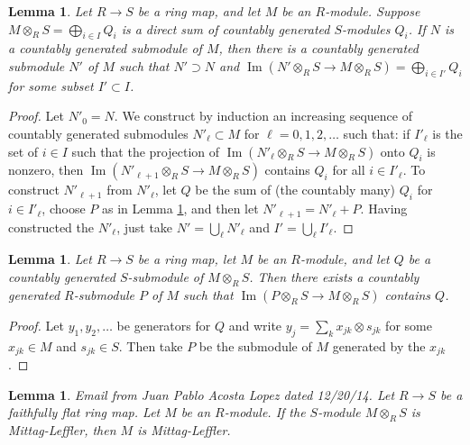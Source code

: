 \documentclass{amsart}
\newenvironment{reference}{\comment}{\endcomment}
\theoremstyle{plain}
\newtheorem{lemma}[subsection]{Lemma}
\theoremstyle{definition}
\theoremstyle{remark}
\numberwithin{equation}{subsection}
\def\Im{\mathop{\mathrm{Im}}}
\begin{document}
\begin{lemma}
\label{lemma-adapted-submodule}
Let $R \to S$ be a ring map, and let $M$ be an $R$-module.  Suppose $M
\otimes_R S = \bigoplus_{i \in I} Q_i$ is a direct sum of countably generated
$S$-modules $Q_i$.  If $N$ is a countably generated submodule of $M$, then
there is a countably generated submodule $N'$ of $M$ such that $N' \supset N$
and $\Im(N' \otimes_R S \to M \otimes_R S) =
\bigoplus_{i \in I'} Q_i$ for some subset $I' \subset I$.
\end{lemma}

\begin{proof}
Let $N'_0 = N$.  We construct by induction an increasing sequence of countably
generated submodules $N'_{\ell} \subset M$ for $\ell = 0, 1, 2, \ldots$
such that: if $I'_{\ell}$ is the set of $i \in I$ such that the projection of
$\Im(N'_{\ell} \otimes_R S \to M \otimes_R S)$ onto $Q_i$ is
nonzero, then $\Im(N'_{\ell + 1} \otimes_R S \to M \otimes_R
S)$ contains $Q_i$ for all $i \in I'_{\ell}$.  To construct $N'_{\ell + 1}$
from $N'_\ell$, let $Q$ be the sum of (the countably many) $Q_i$ for
$i \in I'_{\ell}$, choose $P$ as in Lemma
\ref{lemma-lift-countably-generated-submodule}, and then let $N'_{\ell + 1} =
N'_{\ell} + P$.  Having constructed the $N'_{\ell}$, just take $N' =
\bigcup_{\ell} N'_{\ell}$ and $I' = \bigcup_{\ell} I'_{\ell}$.
\end{proof}


\begin{lemma}
\label{lemma-lift-countably-generated-submodule}
Let $R \to S$ be a ring map, let $M$ be an $R$-module, and let $Q$ be a
countably generated $S$-submodule of $M \otimes_R S$.  Then there exists a
countably generated $R$-submodule $P$ of $M$ such that
$\Im(P \otimes_R S \to M \otimes_R S)$ contains $Q$.
\end{lemma}

\begin{proof}
Let $y_1, y_2, \ldots$ be generators for $Q$ and write $y_j = \sum_k x_{jk}
\otimes s_{jk}$ for some $x_{jk} \in M$ and $s_{jk} \in S$. Then take $P$ be
the submodule of $M$ generated by the $x_{jk}$.
\end{proof}


\begin{lemma}
\label{lemma-ffdescent-ML}
\begin{reference}
Email from Juan Pablo Acosta Lopez dated 12/20/14.
\end{reference}
Let $R \to S$ be a faithfully flat ring map. Let $M$ be an $R$-module. If the
$S$-module $M \otimes_R S$ is Mittag-Leffler, then $M$ is Mittag-Leffler.
\end{lemma}
\end{document}
